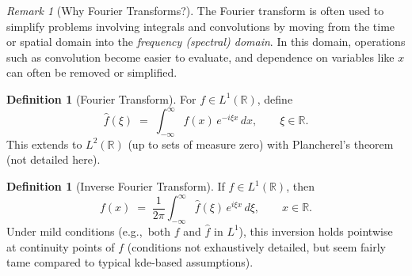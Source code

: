 \documentclass[11pt]{article}
\theoremstyle{plain}
\theoremstyle{definition}
\newtheorem{definition}[theorem]{Definition}
\theoremstyle{remark}
\newtheorem{remark}[theorem]{Remark}
\newcommand{\1}{\mathbbm{1}}
\begin{document}
\vspace{1em}

\begin{remark}[Why Fourier Transforms?]
The Fourier transform is often used to simplify problems involving
integrals and convolutions by moving from the time or spatial domain
into the \emph{frequency (spectral) domain}. In this domain,
operations such as convolution become easier to evaluate, and
dependence on variables like $x$ can often be removed or simplified.
\end{remark}

\vspace{1em}

\begin{definition}[Fourier Transform]
For $f\in L^1(\mathbb{R})$, define
\[
\widehat{f}(\xi) \;=\; \int_{-\infty}^{\infty} f(x)\,e^{-i\xi x}\,dx, \qquad \xi\in\mathbb{R}.
\]
This extends to $L^2(\mathbb{R})$ (up to sets of measure zero) with Plancherel’s theorem (not detailed here).
\end{definition}

\vspace{1em}

\begin{definition}[Inverse Fourier Transform]
If $\widehat{f}\in L^1(\mathbb{R})$, then
\[
f(x) \;=\; \frac{1}{2\pi}\int_{-\infty}^{\infty} \widehat{f}(\xi)\,e^{i\xi x}\,d\xi, \qquad x\in\mathbb{R}.
\]
Under mild conditions (e.g.,\ both $f$ and $\widehat{f}$ in $L^1$), this inversion holds pointwise at continuity points of $f$ (conditions not exhaustively detailed, but seem fairly tame compared to typical kde-based assumptions).
\end{definition}
\end{document}
